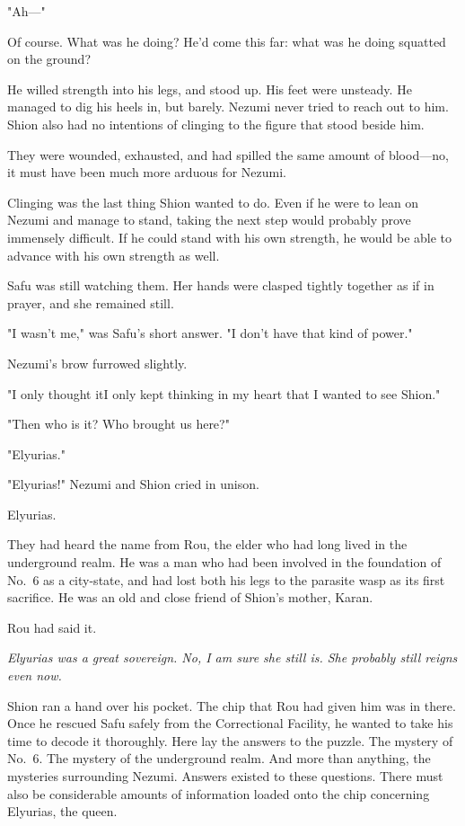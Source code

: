 "Ah---"

Of course. What was he doing? He'd come this far: what was he doing
squatted on the ground?

He willed strength into his legs, and stood up. His feet were unsteady.
He managed to dig his heels in, but barely. Nezumi never tried to reach
out to him. Shion also had no intentions of clinging to the figure that
stood beside him.

They were wounded, exhausted, and had spilled the same amount of
blood---no, it must have been much more arduous for Nezumi.

Clinging was the last thing Shion wanted to do. Even if he were to lean
on Nezumi and manage to stand, taking the next step would probably prove
immensely difficult. If he could stand with his own strength, he would
be able to advance with his own strength as well.

Safu was still watching them. Her hands were clasped tightly together as
if in prayer, and she remained still.

"I wasn't me," was Safu's short answer. "I don't have that kind of
power."

Nezumi's brow furrowed slightly.

"I only thought it\el I only kept thinking in my heart that I wanted to
see Shion."

"Then who is it? Who brought us here?"

"Elyurias."

"Elyurias!" Nezumi and Shion cried in unison.

Elyurias.

They had heard the name from Rou, the elder who had long lived in the
underground realm. He was a man who had been involved in the foundation
of No.~6 as a city-state, and had lost both his legs to the parasite
wasp as its first sacrifice. He was an old and close friend of Shion's
mother, Karan.

Rou had said it.

\emph{Elyurias was a great sovereign. No, I am sure she still is. She probably
still reigns even now.}

Shion ran a hand over his pocket. The chip that Rou had given him was in
there. Once he rescued Safu safely from the Correctional Facility, he
wanted to take his time to decode it thoroughly. Here lay the answers to
the puzzle. The mystery of No.~6. The mystery of the underground realm.
And more than anything, the mysteries surrounding Nezumi. Answers
existed to these questions. There must also be considerable amounts of
information loaded onto the chip concerning Elyurias, the queen.

